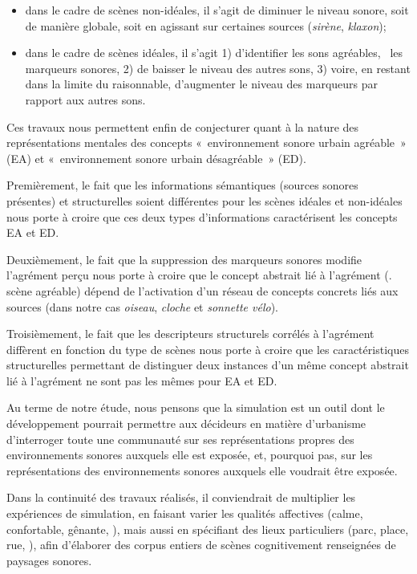 \documentclass[twoside,twocolumn]{article}
\begin{document}
\begin{itemize}
\item dans le cadre de scènes non-idéales, il s'agit de diminuer le niveau sonore, soit de manière globale, soit en agissant sur certaines sources (\emph{sirène}, \emph{klaxon});
\item dans le cadre de scènes idéales, il s'agit 1) d'identifier les sons agréables, \ie~les marqueurs sonores, 2) de baisser le niveau des autres sons, 3) voire, en restant dans la limite du raisonnable, d'augmenter le niveau des marqueurs par rapport aux autres sons.
\end{itemize}

Ces travaux nous permettent enfin de conjecturer quant à la nature des représentations mentales des concepts «~environnement sonore urbain agréable~» (EA) et «~environnement sonore urbain désagréable~» (ED).

Premièrement, le fait que les informations sémantiques (sources sonores présentes) et structurelles soient différentes pour les scènes idéales et non-idéales nous porte à croire que ces deux types d'informations caractérisent les concepts EA et ED.

Deuxièmement, le fait que la suppression des marqueurs sonores modifie l'agrément perçu nous porte à croire que le concept abstrait lié à l'agrément (\eg. scène agréable) dépend de l'activation d'un réseau de concepts concrets liés aux sources (dans notre cas \emph{oiseau}, \emph{cloche} et \emph{sonnette vélo}).

Troisièmement, le fait que les descripteurs structurels corrélés à l'agrément diffèrent en fonction du type de scènes nous porte à croire que les caractéristiques structurelles permettant de distinguer deux instances d'un même concept abstrait lié à l'agrément ne sont pas les mêmes pour EA et ED.

Au terme de notre étude, nous pensons que la simulation est un outil dont le développement pourrait permettre aux décideurs en matière d'urbanisme d'interroger toute une communauté sur ses représentations propres des environnements sonores auxquels elle est exposée, et, pourquoi pas, sur les représentations des environnements sonores auxquels elle voudrait être exposée.

Dans la continuité des travaux réalisés, il conviendrait de multiplier les expériences de simulation, en faisant varier les qualités affectives (calme, confortable, gênante, \etc), mais aussi en spécifiant des lieux particuliers (parc, place, rue, \etc), afin d'élaborer des corpus entiers de scènes cognitivement renseignées de paysages sonores.
\end{document}
